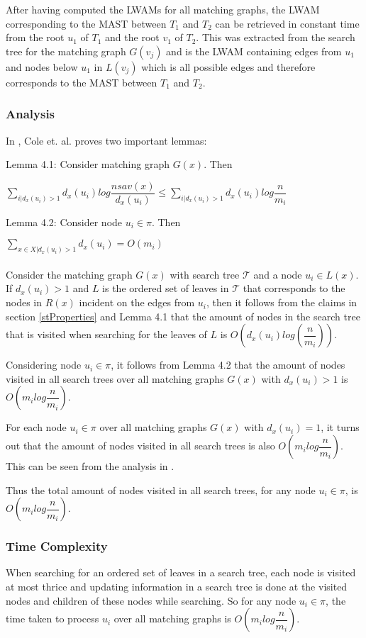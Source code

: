 After having computed the LWAMs for all matching graphs, the LWAM corresponding to the MAST between $T_1$ and $T_2$ can be retrieved in constant time from the root $u_1$ of $T_1$ and the root $v_1$ of $T_2$. This was extracted from the search tree for the matching graph $G(v_j)$ and is the LWAM containing edges from $u_1$ and nodes below $u_1$ in $L(v_j)$ which is all possible edges and therefore corresponds to the MAST between $T_1$ and $T_2$.

\subsubsection{Analysis}
\label{lwam_analysis}
In \cite{nlogn}, Cole et. al. proves two important lemmas:

Lemma 4.1: Consider matching graph $G(x)$. Then

$\sum_{i|d_x(u_i)>1} d_x(u_i)log\dfrac{nsav(x)}{d_x(u_i)} \le \sum_{i|d_x(u_i)>1} d_x(u_i)log\dfrac{n}{m_i}$

Lemma 4.2: Consider node $u_i \in \pi$. Then

$\sum_{x \in X | d_x(u_i)>1} d_x(u_i) = O(m_i)$
\\
\\
Consider the matching graph $G(x)$ with search tree $\mathcal{T}$ and a node $u_i \in L(x)$. If $d_x(u_i) > 1$ and $L$ is the ordered set of leaves in $\mathcal{T}$ that corresponds to the nodes in $R(x)$ incident on the edges from $u_i$, then it follows from the claims in section \ref{stProperties} and Lemma 4.1 that the amount of nodes in the search tree that is visited when searching for the leaves of $L$ is $O(d_x(u_i)log(\dfrac{n}{m_i}))$.

Considering node $u_i \in \pi$, it follows from Lemma 4.2 that the amount of nodes visited in all search trees over all matching graphs $G(x)$ with $d_x(u_i) > 1$ is $O(m_ilog\dfrac{n}{m_i})$.

For each node $u_i \in \pi$ over all matching graphs $G(x)$ with $d_x(u_i) = 1$, it turns out that the amount of nodes visited in all search trees is also $O(m_ilog\dfrac{n}{m_i})$. This can be seen from the analysis in \cite{nlogn}.

Thus the total amount of nodes visited in all search trees, for any node $u_i \in \pi$, is $O(m_ilog\dfrac{n}{m_i})$.

\subsubsection{Time Complexity}
When searching for an ordered set of leaves in a search tree, each node is visited at most thrice and updating information in a search tree is done at the visited nodes and children of these nodes while searching. So for any node $u_i \in \pi$, the time taken to process $u_i$ over all matching graphs is $O(m_ilog\dfrac{n}{m_i})$.

